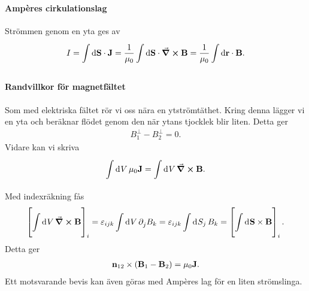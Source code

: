 \paragraph{Ampères cirkulationslag}
Strömmen genom en yta ges av
\begin{align*}
	I = \int\limits_{}^{}\dd{\vb{S}}\cdot \vb{J} = \frac{1}{\mu_{0}}\int\limits_{}^{}\dd{\vb{S}}\cdot \curl{\vb{B}} = \frac{1}{\mu_{0}}\int\limits_{}^{}\dd{\vb{r}}\cdot \vb{B}.
\end{align*}

\paragraph{Randvillkor för magnetfältet}
Som med elektriska fältet rör vi oss nära en ytströmtäthet. Kring denna lägger vi en yta och beräknar flödet genom den när ytans tjocklek blir liten. Detta ger
\begin{align*}
	B_{1}^{\perp} - B_{2}^{\perp} = 0.
\end{align*}
Vidare kan vi skriva
\begin{align*}
	\int\limits_{}^{}\dd[]{V}\mu_{0}\vb{J} = \int\limits_{}^{}\dd[]{V}\curl{\vb{B}}.
\end{align*}
Med indexräkning fås
\begin{align*}
	\left[\int\limits_{}^{}\dd[]{V}\curl{\vb{B}}\right]_{i} = \varepsilon_{ijk}\int\limits_{}^{}\dd[]{V}\partial_{j}^{}B_{k} = \varepsilon_{ijk}\int\limits_{}^{}\dd[]{S_{j}}B_{k} = \left[\int\limits_{}^{}\dd[]{\vb{S}}\times\vb{B}\right]_{i}.
\end{align*}
Detta ger
\begin{align*}
	\vb{n}_{12}\times(\vb{B}_{1} - \vb{B}_{2}) = \mu_{0}\vb{J}.
\end{align*}
Ett motsvarande bevis kan även göras med Ampères lag för en liten strömslinga.